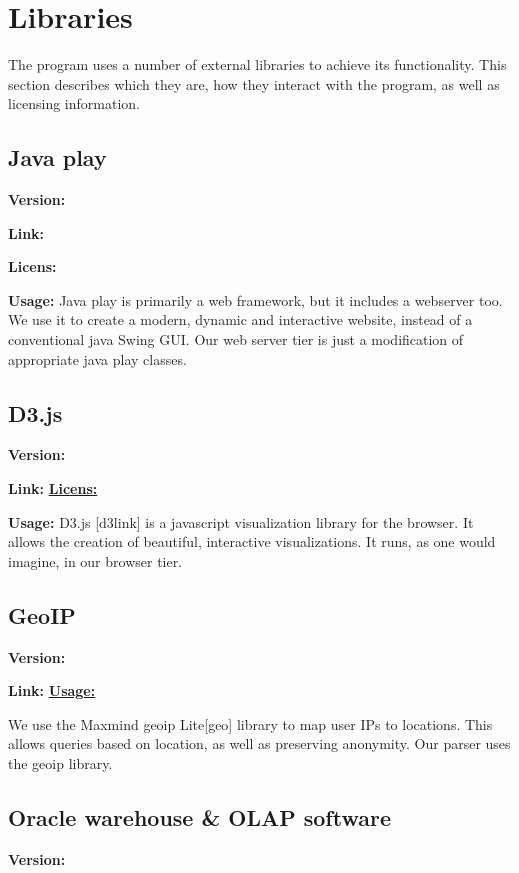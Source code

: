 \section{Libraries}


The program uses a number of external libraries to achieve its functionality. This section describes which they are,
how they interact with the program, as well as licensing information. 

\subsection{Java play}
\textbf{Version:}

\textbf{Link:} \href{http://www.playframework.org/}{}

\textbf{Licens:}


\textbf{Usage:} 
Java play is primarily a web framework, but it includes a webserver too.
We use it to create a modern, dynamic and interactive website, instead of a conventional java Swing GUI.
Our web server tier is just a modification of appropriate java play classes.

\subsection{D3.js}
\textbf{Version:} 

\textbf{Link:} \href{}

\textbf{Licens:}


\textbf{Usage:} 
D3.js [d3link] is a javascript visualization library for the browser.
It allows the creation of beautiful, interactive visualizations.
It runs, as one would imagine, in our browser tier.

\subsection{GeoIP}\label{geo}
\textbf{Version:} 

\textbf{Link:} \href{}



\textbf{Usage:} 

We use the Maxmind geoip Lite[geo] library to map user IPs to locations.
This allows queries based on location, as well as preserving anonymity.
Our parser uses the geoip library.


\subsection{Oracle warehouse & OLAP software}
\textbf{Version:} 

